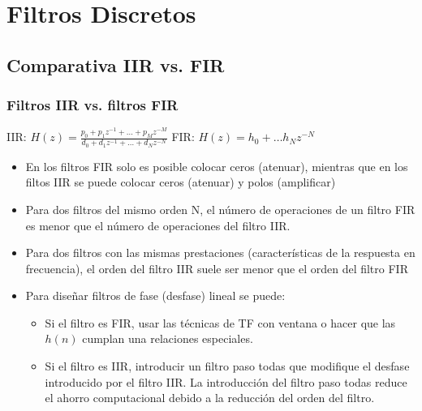 
\section{Filtros Discretos}




\subsection{Comparativa IIR vs. FIR}

\begin{frame}
\frametitle{Filtros IIR vs. filtros FIR}

{\footnotesize
\hspace{0.5cm}\alert{IIR:} $\displaystyle H(z)=\frac{p_0+p_1 z^{-1}+ \dots +p_M z^{-M}}{d_0+d_1 z^{-1}+ \dots +d_N z^{-N}}$
\hspace{0.5cm}\alert{FIR:} $H(z)=h_0+\dots h_N z^{-N}$}
\begin{itemize}
\small
\item En los filtros FIR solo es posible colocar ceros (atenuar), mientras que en los filtos IIR se puede colocar ceros (atenuar) y polos (amplificar)
\item Para dos filtros del mismo orden N, el número de operaciones de un filtro FIR es menor que el número de operaciones del filtro IIR. 
\item Para dos filtros con las mismas prestaciones (características de la respuesta en frecuencia), el orden del filtro IIR suele ser menor que el orden del filtro FIR
\item Para diseñar filtros de fase (desfase) lineal se puede:
\begin{itemize}
\item Si el filtro es FIR, usar las técnicas de TF con ventana o hacer que las $h(n)$ cumplan una relaciones especiales. 
\item Si el filtro es IIR, introducir un filtro paso todas que modifique el desfase introducido por el filtro IIR. La introducción del filtro paso todas reduce el ahorro computacional debido a la reducción del orden del filtro.
\end{itemize}

\end{itemize}
\end{frame}
